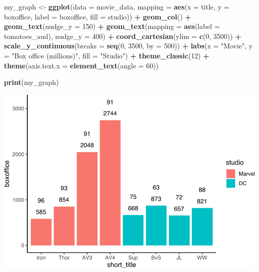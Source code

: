\documentclass[
]{krantz}
\makeatletter
\newenvironment{Shaded}{\begin{snugshade}}{\end{snugshade}}
\newcommand{\DataTypeTok}[1]{\textcolor[rgb]{0.27,0.27,0.27}{#1}}
\newcommand{\DecValTok}[1]{\textcolor[rgb]{0.06,0.06,0.06}{#1}}
\newcommand{\KeywordTok}[1]{\textcolor[rgb]{0.27,0.27,0.27}{\textbf{#1}}}
\newcommand{\NormalTok}[1]{#1}
\newcommand{\OperatorTok}[1]{\textcolor[rgb]{0.43,0.43,0.43}{\textbf{#1}}}
\newcommand{\StringTok}[1]{\textcolor[rgb]{0.5,0.5,0.5}{#1}}
\newenvironment{kframe}{%
\medskip{}
\setlength{\fboxsep}{.8em}
 \def\at@end@of@kframe{}%
 \ifinner\ifhmode%
  \def\at@end@of@kframe{\end{minipage}}%
  \begin{minipage}{\columnwidth}%
 \fi\fi%
 \def\FrameCommand##1{\hskip\@totalleftmargin \hskip-\fboxsep
 \colorbox{shadecolor}{##1}\hskip-\fboxsep
     \hskip-\linewidth \hskip-\@totalleftmargin \hskip\columnwidth}%
 \MakeFramed {\advance\hsize-\width
   \@totalleftmargin\z@ \linewidth\hsize
   \@setminipage}}%
 {\par\unskip\endMakeFramed%
 \at@end@of@kframe}
\renewenvironment{Shaded}{\begin{kframe}}{\end{kframe}}
\makeatother
\begin{document}
\begin{Shaded}
\begin{Highlighting}[]
\NormalTok{my_graph <-}\StringTok{ }\KeywordTok{ggplot}\NormalTok{(}\DataTypeTok{data =}\NormalTok{ movie_data,}
           \DataTypeTok{mapping =} \KeywordTok{aes}\NormalTok{(}\DataTypeTok{x =}\NormalTok{ title,}
                         \DataTypeTok{y =}\NormalTok{ boxoffice,}
                         \DataTypeTok{label =}\NormalTok{ boxoffice, }
                         \DataTypeTok{fill =}\NormalTok{ studio)) }\OperatorTok{+}
\StringTok{  }\KeywordTok{geom_col}\NormalTok{() }\OperatorTok{+}
\StringTok{  }\KeywordTok{geom_text}\NormalTok{(}\DataTypeTok{nudge_y =} \DecValTok{150}\NormalTok{)  }\OperatorTok{+}
\StringTok{  }\KeywordTok{geom_text}\NormalTok{(}\DataTypeTok{mapping =} \KeywordTok{aes}\NormalTok{(}\DataTypeTok{label =}\NormalTok{ tomatoes_aud), }
            \DataTypeTok{nudge_y =} \DecValTok{400}\NormalTok{) }\OperatorTok{+}
\StringTok{  }\KeywordTok{coord_cartesian}\NormalTok{(}\DataTypeTok{ylim =} \KeywordTok{c}\NormalTok{(}\DecValTok{0}\NormalTok{, }\DecValTok{3500}\NormalTok{)) }\OperatorTok{+}
\StringTok{  }\KeywordTok{scale_y_continuous}\NormalTok{(}\DataTypeTok{breaks =} \KeywordTok{seq}\NormalTok{(}\DecValTok{0}\NormalTok{, }\DecValTok{3500}\NormalTok{, }\DataTypeTok{by =} \DecValTok{500}\NormalTok{)) }\OperatorTok{+}
\StringTok{  }\KeywordTok{labs}\NormalTok{(}\DataTypeTok{x =} \StringTok{"Movie"}\NormalTok{,}
       \DataTypeTok{y =} \StringTok{"Box office (millions)"}\NormalTok{,}
       \DataTypeTok{fill =} \StringTok{"Studio"}\NormalTok{) }\OperatorTok{+}
\StringTok{  }\KeywordTok{theme_classic}\NormalTok{(}\DecValTok{12}\NormalTok{) }\OperatorTok{+}
\StringTok{  }\KeywordTok{theme}\NormalTok{(}\DataTypeTok{axis.text.x =} \KeywordTok{element_text}\NormalTok{(}\DataTypeTok{angle =} \DecValTok{60}\NormalTok{))}

\KeywordTok{print}\NormalTok{(my_graph)}
\end{Highlighting}
\end{Shaded}

\includegraphics[width=0.65\linewidth]{bookdown_files/figure-latex/unnamed-chunk-268-1}
\end{document}
